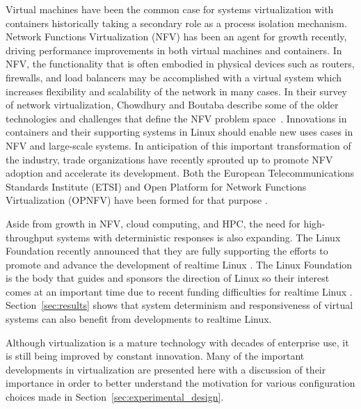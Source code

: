 Virtual machines have been the common case for systems virtualization with containers historically taking a secondary role as a process isolation mechanism.
Network Functions Virtualization (NFV) has been an agent for growth recently, driving performance improvements in both virtual machines and containers.
In NFV, the functionality that is often embodied in physical devices such as routers, firewalls, and load balancers may be accomplished with a virtual system which increases flexibility and scalability of the network in many cases.
In their survey of network virtualization, Chowdhury and Boutaba describe some of the older technologies and challenges that define the NFV problem space~\autocite{_chowdhury_1}.
Innovations in containers and their supporting systems in Linux should enable new uses cases in NFV and large-scale systems.
In anticipation of this important transformation of the industry, trade organizations have recently sprouted up to promote NFV adoption and accelerate its development.
Both the European Telecommunications Standards Institute (ETSI) and Open Platform for Network Functions Virtualization (OPNFV) have been formed for that purpose \autocite{opnfv1, cohnopnfv}.

Aside from growth in NFV, cloud computing, and HPC, the need for high-throughput systems with deterministic responses is also expanding.
The Linux Foundation recently announced that they are fully supporting the efforts to promote and advance the development of realtime Linux \autocite{_linux_foundation_1}.
The Linux Foundation is the body that guides and sponsors the direction of Linux so their interest comes at an important time due to recent funding difficulties for realtime Linux \autocite{_lwn_1}.
Section~\ref{sec:results} shows that system determinism and responsiveness of virtual systems can also benefit from developments to realtime Linux.

Although virtualization is a mature technology with decades of enterprise use, it is still being improved by constant innovation.  
Many of the important developments in virtualization are presented here with a discussion of their importance in order to better understand the motivation for various configuration choices made in Section~\ref{sec:experimental_design}.  


